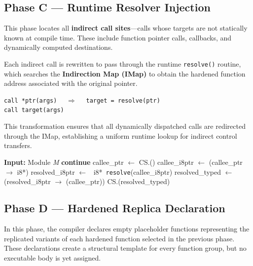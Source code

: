 \subsection*{Phase C — Runtime Resolver Injection}
This phase locates all \textbf{indirect call sites}—calls whose targets are not
statically known at compile time. These include function pointer calls, callbacks,
and dynamically computed destinations.

Each indirect call is rewritten to pass through the runtime \texttt{resolve()}
routine, which searches the \textbf{Indirection Map (IMap)} to obtain the hardened
function address associated with the original pointer.

\begin{center}
\texttt{call *ptr(args)} 
$\quad\Rightarrow\quad$
\texttt{target = resolve(ptr)} \\
\texttt{call target(args)}
\end{center}

This transformation ensures that all dynamically dispatched calls
are redirected through the IMap, establishing a uniform runtime lookup
for indirect control transfers.

\begin{algorithm}[H]
\caption{Phase C — Rewrite Indirect Calls}
\label{alg:phaseC}
\begin{algorithmic}[1]
\State \textbf{Input:} Module \textit{M}
     \State \textbf{continue} \EndIf
    \State callee\_ptr   $\gets$ CS.()
    \State callee\_i8ptr $\gets$ (callee\_ptr $\rightarrow$ i8*)
    \State resolved\_i8ptr $\gets$ ~i8*~\texttt{resolve}(callee\_i8ptr)
    \State resolved\_typed $\gets$ (resolved\_i8ptr $\rightarrow$ (callee\_ptr))
    \State CS.(resolved\_typed)
  \EndFor
\EndFor
\end{algorithmic}
\end{algorithm}
\clearpage

\subsection*{Phase D — Hardened Replica Declaration}
In this phase, the compiler declares empty placeholder functions representing
the replicated variants of each hardened function selected in the previous phase.
These declarations create a structural template for every function group, but
no executable body is yet assigned.

